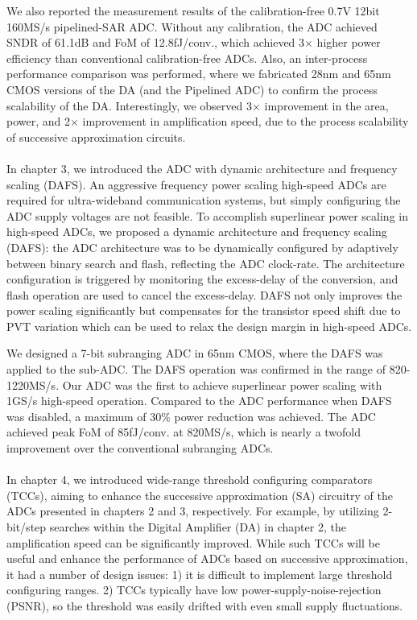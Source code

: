 We also reported the measurement results of the calibration-free 0.7V 12bit 160MS/s pipelined-SAR ADC. Without any calibration, the ADC achieved SNDR of 61.1dB and FoM of 12.8fJ/conv., which achieved 3$\times$ higher power efficiency than conventional calibration-free ADCs. Also, an inter-process performance comparison was performed, where we fabricated 28nm and 65nm CMOS versions of the DA (and the Pipelined ADC) to confirm the process scalability of the DA.
Interestingly, we observed 3$\times$ improvement in the area, power, and 2$\times$ improvement in amplification speed, due to the process scalability of successive approximation circuits.
\\
\\
In chapter 3, we introduced the ADC with dynamic architecture and frequency scaling (DAFS).
An aggressive frequency power scaling high-speed ADCs are required for ultra-wideband communication systems, but simply configuring the ADC supply voltages are not feasible.
To accomplish superlinear power scaling in high-speed ADCs, we proposed a dynamic architecture and frequency scaling (DAFS): the ADC architecture was to be dynamically configured by adaptively between binary search and flash, reflecting the ADC clock-rate. The architecture configuration is triggered by monitoring the excess-delay of the conversion, and flash operation are used to cancel the excess-delay. DAFS not only improves the power scaling significantly but compensates for the transistor speed shift due to PVT variation which can be used to relax the design margin in high-speed ADCs.

We designed a 7-bit subranging ADC in 65nm CMOS, where the DAFS was applied to the sub-ADC. The DAFS operation was confirmed in the range of 820-1220MS/s. Our ADC was the first to achieve superlinear power scaling with 1GS/s high-speed operation. Compared to the ADC performance when DAFS was disabled, a maximum of 30\% power reduction was achieved. The ADC achieved peak FoM of 85fJ/conv. at 820MS/s, which is nearly a twofold improvement over the conventional subranging ADCs.
\\
\\
In chapter 4, we introduced wide-range threshold configuring comparators (TCCs), aiming to enhance the successive approximation (SA) circuitry of the ADCs presented in chapters 2 and 3, respectively.
For example, by utilizing 2-bit/step searches within the Digital Amplifier (DA) in chapter 2, the amplification speed can be significantly improved. 
While such TCCs will be useful and enhance the performance of ADCs based on successive approximation, it had a number of design issues: 1) it is difficult to implement large threshold configuring ranges. 2) TCCs typically have low power-supply-noise-rejection (PSNR), so the threshold was easily drifted with even small supply fluctuations.

